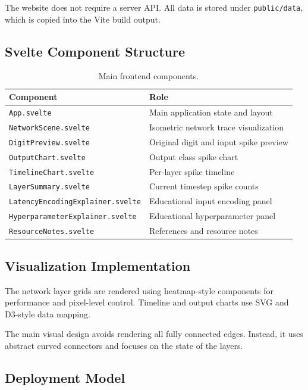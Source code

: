 \documentclass[11pt,a4paper]{article}
\begin{document}
The website does not require a server API. All data is stored under \texttt{public/data}, which is copied into the Vite build output.

\subsection{Svelte Component Structure}

\begin{table}[H]
\centering
\caption{Main frontend components.}
\begin{tabularx}{\textwidth}{lX}
\toprule
Component & Role \\
\midrule
\texttt{App.svelte} & Main application state and layout \\
\texttt{NetworkScene.svelte} & Isometric network trace visualization \\
\texttt{DigitPreview.svelte} & Original digit and input spike preview \\
\texttt{OutputChart.svelte} & Output class spike chart \\
\texttt{TimelineChart.svelte} & Per-layer spike timeline \\
\texttt{LayerSummary.svelte} & Current timestep spike counts \\
\texttt{LatencyEncodingExplainer.svelte} & Educational input encoding panel \\
\texttt{HyperparameterExplainer.svelte} & Educational hyperparameter panel \\
\texttt{ResourceNotes.svelte} & References and resource notes \\
\bottomrule
\end{tabularx}
\end{table}

\subsection{Visualization Implementation}

The network layer grids are rendered using heatmap-style components for performance and pixel-level control. Timeline and output charts use SVG and D3-style data mapping.

The main visual design avoids rendering all fully connected edges. Instead, it uses abstract curved connectors and focuses on the state of the layers.

\subsection{Deployment Model}
\end{document}

